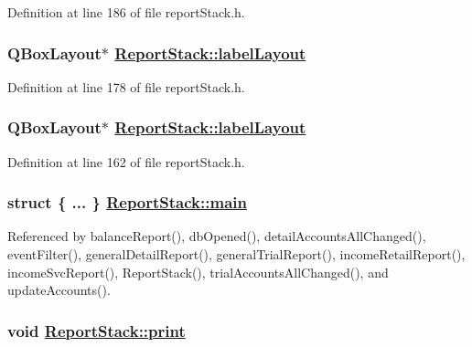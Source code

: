 Definition at line 186 of file report\-Stack.h.\hypertarget{classReportStack_r96}{
\subsubsection[labelLayout]{\setlength{\rightskip}{0pt plus 5cm}QBox\-Layout$\ast$ \hyperlink{classReportStack_r82}{Report\-Stack::label\-Layout}}}
\label{classReportStack_r96}


Definition at line 178 of file report\-Stack.h.\hypertarget{classReportStack_r82}{
\subsubsection[labelLayout]{\setlength{\rightskip}{0pt plus 5cm}QBox\-Layout$\ast$ \hyperlink{classReportStack_r82}{Report\-Stack::label\-Layout}}}
\label{classReportStack_r82}


Definition at line 162 of file report\-Stack.h.\hypertarget{classReportStack_r79}{
\subsubsection[main]{\setlength{\rightskip}{0pt plus 5cm}struct \{ ... \}   \hyperlink{classReportStack_r79}{Report\-Stack::main}}}
\label{classReportStack_r79}




Referenced by balance\-Report(), db\-Opened(), detail\-Accounts\-All\-Changed(), event\-Filter(), general\-Detail\-Report(), general\-Trial\-Report(), income\-Retail\-Report(), income\-Svc\-Report(), Report\-Stack(), trial\-Accounts\-All\-Changed(), and update\-Accounts().\hypertarget{classReportStack_r84}{
\subsubsection[print]{\setlength{\rightskip}{0pt plus 5cm}void \hyperlink{classReportStack_r84}{Report\-Stack::print}}}
\label{classReportStack_r84}


